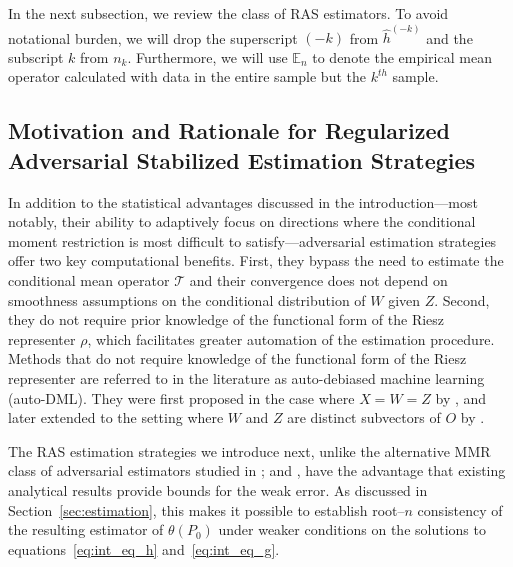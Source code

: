 \documentclass[twoside,11pt]{article}
\begin{document}
In the next subsection, we review the class of RAS estimators. To avoid notational burden, we will drop the superscript $(-k)$ from $\hat{h}^{(-k)}$ and the subscript $k$ from $n_k$. Furthermore, we will use $\mathbb{E}_n$ to denote the empirical mean operator calculated with data in the entire sample but the $k^{th}$ sample.

 \subsection{Motivation and Rationale for Regularized Adversarial Stabilized Estimation Strategies}\label{sec:adversarial_estimators}

In addition to the statistical advantages discussed in the introduction—most notably, their ability to adaptively focus on directions where the conditional moment restriction is most difficult to satisfy—adversarial estimation strategies offer two key computational benefits. First, they bypass the need to estimate the conditional mean operator $\mathcal{T}$ and their convergence does not depend on smoothness assumptions on the conditional distribution of $W$ given $Z$. Second, they do not require prior knowledge of the functional form of the Riesz representer $\rho$, which facilitates greater automation of the estimation procedure. Methods that do not require knowledge of the functional form of the Riesz representer are referred to in the literature as auto-debiased machine learning (auto-DML). They were first proposed in the case where $X = W = Z$ by \cite{chernozhukov2022riesznet, chernozhukov2022automatic, chernozhukov2022debiased}, and later extended to the setting where $W$ and $Z$ are distinct subvectors of $O$ by \cite{bennett2022inference,bennett2023source}.


The RAS estimation strategies we introduce next, unlike the alternative MMR class of adversarial estimators studied in \cite{muandet2020kernel,zhang2023instrumental, mastouri2021proximal}; and \cite{park2024proximal}, have the advantage that existing analytical results provide bounds for the weak error. As discussed in Section~\ref{sec:estimation}, this makes it possible to establish root--$n$ consistency of the resulting estimator of $\theta(P_0)$ under weaker conditions on the solutions to equations~\eqref{eq:int_eq_h} and~\eqref{eq:int_eq_g}.
\end{document}
